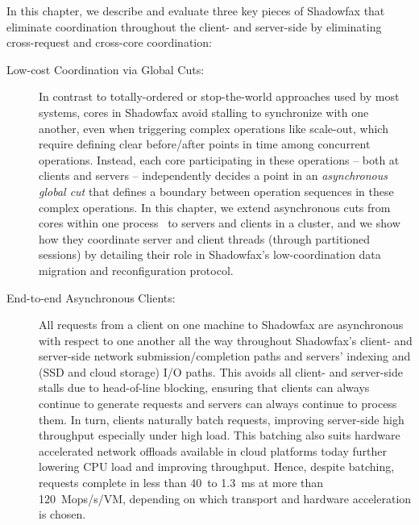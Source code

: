 In this chapter, we describe and evaluate three key pieces of Shadowfax that
eliminate coordination throughout the client- and server-side by eliminating
cross-request and cross-core coordination:
%
\begin{description}
\item[Low-cost Coordination via Global Cuts:]
%
In contrast to totally-ordered or stop-the-world approaches used by most
systems, cores in Shadowfax avoid stalling to synchronize with one another, even when
triggering complex operations like scale-out, which require
defining clear before/after points in time among concurrent operations.
%
Instead, each core participating in these operations -- both at clients and
servers -- independently decides a point in an \emph{asynchronous global
cut} that defines a boundary between operation sequences in these complex operations.
%
In this chapter, we extend asynchronous cuts from cores within one
process~\cite{faster,cpr} to servers
and clients in a cluster, and we show how they coordinate server
and client threads (through partitioned sessions) by detailing
their role in Shadowfax's low-coordination data migration and
reconfiguration protocol.

%

\item[End-to-end Asynchronous Clients:]
All requests from a client on one machine to Shadowfax are asynchronous with
respect to one another all the way throughout Shadowfax's client- and
server-side network submission/completion paths and servers' indexing and
(SSD and cloud storage) I/O paths.
%
This avoids all client- and server-side stalls due to head-of-line
blocking, ensuring that clients can always continue to generate requests and
servers can always continue to process them.
%
In turn, clients naturally batch requests, improving server-side high
throughput especially under high load.
%
This batching also suits hardware accelerated network offloads available in
cloud platforms today further lowering CPU load and improving throughput.
%
Hence, despite batching, requests complete in less than 40~\us to 1.3~ms at
more than 120~Mops/s/VM, depending on which transport and hardware
acceleration is chosen.
%


\end{description}
